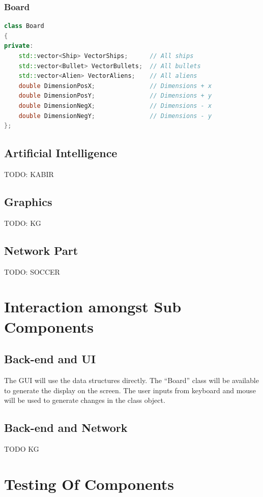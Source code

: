 \documentclass{article}
\begin{document}
				\subsubsection{Board}
					\begin{lstlisting}[language=C++, caption={Class Parameters for Board}]
class Board
{
private:
	std::vector<Ship> VectorShips;		// All ships
	std::vector<Bullet> VectorBullets;	// All bullets
	std::vector<Alien> VectorAliens;	// All aliens
	double DimensionPosX;				// Dimensions + x	
	double DimensionPosY;				// Dimensions + y	
	double DimensionNegX;				// Dimensions - x	
	double DimensionNegY;				// Dimensions - y		
};
					\end{lstlisting}
			\subsection{Artificial Intelligence}
				TODO: KABIR
			\subsection{Graphics}
				TODO: KG
			\subsection{Network Part}
				TODO: SOCCER
	\section{Interaction amongst Sub Components}
			\subsection{Back-end and UI}
				The GUI will use the data structures directly. The ``Board'' class will be available to generate the display on the screen. The user inputs from keyboard and mouse will be used to generate changes in the class object. 
			\subsection{Back-end and Network}
				TODO KG
	\section{Testing Of Components}
\end{document}
